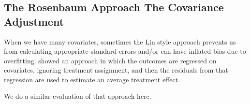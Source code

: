 \documentclass[
  12pt,
]{book}
\theoremstyle{definition}
\theoremstyle{definition}
\theoremstyle{definition}
\theoremstyle{remark}
\begin{document}
\hypertarget{the-rosenbaum-approach-the-covariance-adjustment}{%
\subsection{The Rosenbaum Approach The Covariance
Adjustment}\label{the-rosenbaum-approach-the-covariance-adjustment}}

When we have many covariates, sometimes the Lin style approach prevents
us from calculating appropriate standard errors and/or can have inflated
bias due to overfitting. \citet{rosenbaum:2002a} showed an approach in
which the outcomes are regressed on covariates, ignoring treatment
assignment, and then the residuals from that regression are used to
estimate an average treatment effect.

We do a similar evaluation of that approach here.
\end{document}
